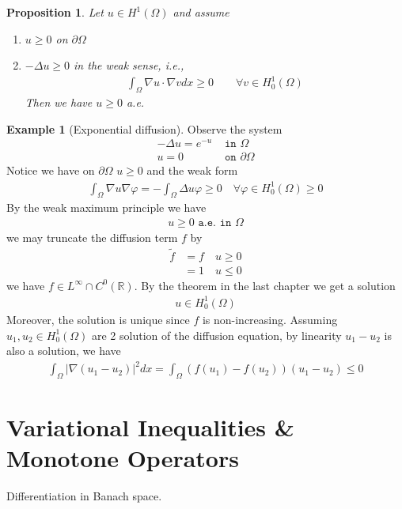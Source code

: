 \documentclass[a4paper,11pt,oneside,fleqn]{book}
\newtheorem{proposition}[theorem]{Proposition}
\theoremstyle{definition}
\newtheorem*{example}{Example}
\theoremstyle{remark}
\begin{document}
\begin{proposition}
	Let $u \in H^1(\Omega)$ and assume
	\begin{enumerate}
		\item $u \ge 0$ on $\partial\Omega$
		\item $-\Delta u \ge 0$ in the weak sense, i.e., 
		\begin{align*}
			\int_\Omega \nabla u \cdot \nabla v dx \ge 0 \qquad \forall v \in H^1_0(\Omega)
		\end{align*}
		Then we have $u \ge 0$ a.e.
	\end{enumerate}
\end{proposition}

\begin{example}[Exponential diffusion]
Observe the system
\begin{align*}
	-\Delta u = e^{-u} &\texttt{ in } \Omega\\
	u = 0 &\texttt{ on } \partial \Omega
\end{align*}
Notice we have on $\partial\Omega$ $u \ge 0$ and the weak form 
\begin{align*}
	 \int_\Omega \nabla u \nabla \varphi = - \int_\Omega \Delta u \varphi  \ge 0 \quad \forall \varphi \in H^1_0(\Omega) \ge 0 
\end{align*}
By the weak maximum principle we have
\begin{align*}
	u \ge 0 \texttt{ a.e. in  } \Omega 
\end{align*}
we may truncate the diffusion term $f$ by
\begin{align*}
	\tilde{f} &= f \quad u \ge 0\\
	&= 1 \quad u \le 0 
\end{align*}
we have $f \in L^\infty \cap C^0(\mathbb{R})$. By the theorem in the last chapter we get a solution
\begin{align*}
	u \in H^1_0(\Omega)
\end{align*}
Moreover, the solution is unique since $f$ is non-increasing. Assuming $u_1, u_2 \in H^1_0(\Omega)$ are 2 solution of the diffusion equation, by linearity $u_1 - u_2$ is also a solution, we have
\begin{align*}
	\int_\Omega |\nabla(u_1 - u_2)|^2 dx = \int_\Omega (f(u_1) - f(u_2))(u_1 - u_2) \le 0 
\end{align*}
\end{example}





\section{Variational Inequalities \& Monotone Operators}
Differentiation in Banach space. 
\end{document}
